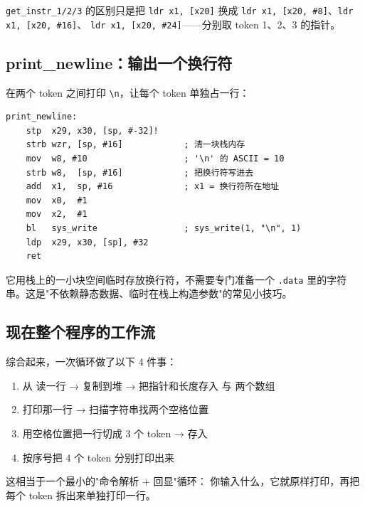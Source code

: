 \texttt{get\_instr\_1/2/3} 的区别只是把 \texttt{ldr x1, [x20]}
换成 \texttt{ldr x1, [x20, \#8]}、\texttt{ldr x1, [x20, \#16]}、
\texttt{ldr x1, [x20, \#24]}——分别取 token 1、2、3 的指针。

\subsection{print\_newline：输出一个换行符}

在两个 token 之间打印 \texttt{\textbackslash n}，让每个 token 单独占一行：

\begin{lstlisting}[style=asm, caption=hello.s — print\_newline]
print_newline:
    stp  x29, x30, [sp, #-32]!
    strb wzr, [sp, #16]            ; 清一块栈内存
    mov  w8, #10                   ; '\n' 的 ASCII = 10
    strb w8,  [sp, #16]            ; 把换行符写进去
    add  x1,  sp, #16              ; x1 = 换行符所在地址
    mov  x0,  #1
    mov  x2,  #1
    bl   sys_write                 ; sys_write(1, "\n", 1)
    ldp  x29, x30, [sp], #32
    ret
\end{lstlisting}

它用栈上的一小块空间临时存放换行符，不需要专门准备一个 \texttt{.data}
里的字符串。这是"不依赖静态数据、临时在栈上构造参数"的常见小技巧。

\subsection{现在整个程序的工作流}

综合起来，一次循环做了以下 4 件事：

\begin{enumerate}
    \item 从  读一行 →  复制到堆 →
        把指针和长度存入  与  两个数组
    \item 打印那一行 → 扫描字符串找两个空格位置
    \item 用空格位置把一行切成 3 个 token → 存入 
    \item 按序号把 4 个 token 分别打印出来
\end{enumerate}

这相当于一个最小的"命令解析 + 回显"循环：
你输入什么，它就原样打印，再把每个 token 拆出来单独打印一行。
